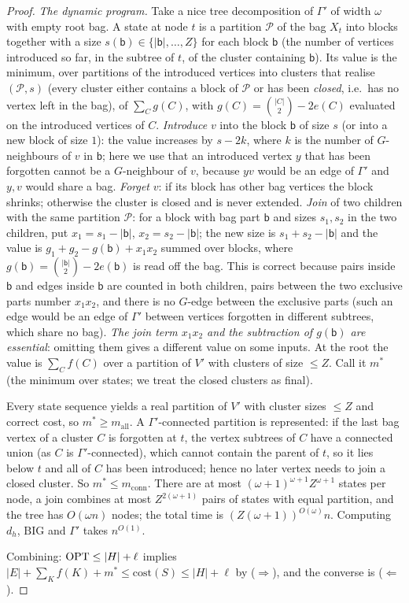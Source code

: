 \begin{proof}
\emph{The dynamic program.} Take a nice tree decomposition of $\Gamma'$ of width $\omega$ with empty root bag. A state at node $t$ is a partition $\mathcal P$ of the bag $X_t$ into blocks together with a size $s(\mathsf b)\in\{|\mathsf b|,\dots,Z\}$ for each block $\mathsf b$ (the number of vertices introduced so far, in the subtree of $t$, of the cluster containing $\mathsf b$). Its value is the minimum, over partitions of the introduced vertices into clusters that realise $(\mathcal P,s)$ (every cluster either contains a block of $\mathcal P$ or has been \emph{closed}, i.e.\ has no vertex left in the bag), of $\sum_C g(C)$, with $g(C)=\binom{|C|}2-2e(C)$ evaluated on the introduced vertices of $C$. \emph{Introduce} $v$ into the block $\mathsf b$ of size $s$ (or into a new block of size $1$): the value increases by $s-2k$, where $k$ is the number of $G$-neighbours of $v$ in $\mathsf b$; here we use that an introduced vertex $y$ that has been forgotten cannot be a $G$-neighbour of $v$, because $yv$ would be an edge of $\Gamma'$ and $y,v$ would share a bag. \emph{Forget} $v$: if its block has other bag vertices the block shrinks; otherwise the cluster is closed and is never extended. \emph{Join} of two children with the same partition $\mathcal P$: for a block with bag part $\mathsf b$ and sizes $s_1,s_2$ in the two children, put $x_1=s_1-|\mathsf b|$, $x_2=s_2-|\mathsf b|$; the new size is $s_1+s_2-|\mathsf b|$ and the value is $g_1+g_2-g(\mathsf b)+x_1x_2$ summed over blocks, where $g(\mathsf b)=\binom{|\mathsf b|}2-2e(\mathsf b)$ is read off the bag. This is correct because pairs inside $\mathsf b$ and edges inside $\mathsf b$ are counted in both children, pairs between the two exclusive parts number $x_1x_2$, and there is no $G$-edge between the exclusive parts (such an edge would be an edge of $\Gamma'$ between vertices forgotten in different subtrees, which share no bag). \emph{The join term $x_1x_2$ and the subtraction of $g(\mathsf b)$ are essential}: omitting them gives a different value on some inputs. At the root the value is $\sum_Cf(C)$ over a partition of $V'$ with clusters of size $\le Z$. Call it $m^*$ (the minimum over states; we treat the closed clusters as final).

Every state sequence yields a real partition of $V'$ with cluster sizes $\le Z$ and correct cost, so $m^*\ge m_{\mathrm{all}}$. A $\Gamma'$-connected partition is represented: if the last bag vertex of a cluster $C$ is forgotten at $t$, the vertex subtrees of $C$ have a connected union (as $C$ is $\Gamma'$-connected), which cannot contain the parent of $t$, so it lies below $t$ and all of $C$ has been introduced; hence no later vertex needs to join a closed cluster. So $m^*\le m_{\mathrm{conn}}$. There are at most $(\omega+1)^{\omega+1}Z^{\omega+1}$ states per node, a join combines at most $Z^{2(\omega+1)}$ pairs of states with equal partition, and the tree has $O(\omega n)$ nodes; the total time is $(Z(\omega+1))^{O(\omega)}n$. Computing $d_h$, $\mathrm{BIG}$ and $\Gamma'$ takes $n^{O(1)}$.

Combining: $\mathrm{OPT}\le|H|+\ell$ implies $|E|+\sum_Kf(K)+m^*\le\mathrm{cost}(S)\le|H|+\ell$ by ($\Rightarrow$), and the converse is ($\Leftarrow$).
\end{proof}
